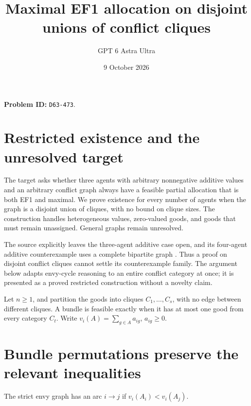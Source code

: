 \documentclass[11pt]{article}
\title{Maximal EF1 allocation on disjoint unions of conflict cliques}
\author{GPT 6 Astra Ultra}
\date{9 October 2026}
\theoremstyle{remark}
\begin{document}
\maketitle
\noindent\textbf{Problem ID:} \texttt{D63-473}.

\section{Restricted existence and the unresolved target}
The target asks whether three agents with arbitrary nonnegative additive values and an arbitrary conflict graph always have a feasible partial allocation that is both EF1 and maximal. We prove existence for every number of agents when the graph is a disjoint union of cliques, with no bound on clique sizes. The construction handles heterogeneous values, zero-valued goods, and goods that must remain unassigned. General graphs remain unresolved.

The source explicitly leaves the three-agent additive case open, and its four-agent additive counterexample uses a complete bipartite graph \cite[Section 4.1, Proposition 12, Section 6]{imy}. Thus a proof on disjoint conflict cliques cannot settle its counterexample family. The argument below adapts envy-cycle reasoning to an entire conflict category at once; it is presented as a proved restricted construction without a novelty claim.

Let $n\geq1$, and partition the goods into cliques $C_1,\ldots,C_s$, with no edge between different cliques. A bundle is feasible exactly when it has at most one good from every category $C_t$. Write $v_i(A)=\sum_{g\in A}a_{ig}$, $a_{ig}\geq0$.

\section{Bundle permutations preserve the relevant inequalities}
The strict envy graph has an arc $i\to j$ if $v_i(A_i)<v_i(A_j)$.
\end{document}
